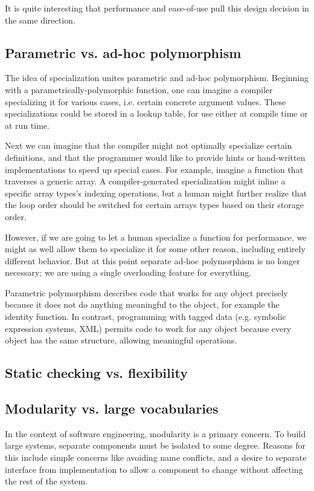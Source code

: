 It is quite interesting that performance and ease-of-use pull this design
decision in the same direction.

\subsection{Parametric vs. ad-hoc polymorphism}

The idea of specialization unites parametric and ad-hoc polymorphism.
Beginning with a parametrically-polymorphic function, one can imagine
a compiler specializing it for various cases, i.e. certain concrete argument
values. These specializations could be stored in a lookup table, for use
either at compile time or at run time.

Next we can imagine that the compiler might not optimally specialize
certain definitions, and that the programmer would like to provide
hints or hand-written implementations to speed up special cases.
For example, imagine a function that traverses a generic array. A compiler-generated
specialization might inline a specific array types's indexing operations, but a human
might further realize that the loop order should be switched for certain
arrays types based on their storage order.

However, if we are going to let a human specialize a function for performance,
we might as well allow them to specialize it for some other reason, including
entirely different behavior. But at this point separate ad-hoc polymorphism
is no longer necessary; we are using a single overloading feature for
everything.


Parametric polymorphism describes code that works for any object precisely
because it does not do anything meaningful to the object, for example the
identity function. In contrast, programming with tagged data (e.g.
symbolic expression systems, XML) permits code to work for any object
because every object has the same structure, allowing meaningful
operations.

\subsection{Static checking vs. flexibility}

\subsection{Modularity vs. large vocabularies}

In the context of software engineering, modularity is a primary concern.
To build large systems, separate components must be isolated to some
degree.
Reasons for this include simple concerns like avoiding name conflicts,
and a desire to separate interface from implementation to allow
a component to change without affecting the rest of the system.

